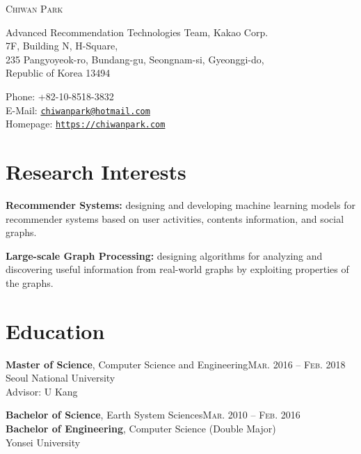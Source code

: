 \documentclass[11pt,a4paper]{article}
\makeatletter
\def\myname{Chiwan Park}
\def\myphone{+82-10-8518-3832}
\def\myaddress{Advanced Recommendation Technologies Team, Kakao Corp.\\
7F, Building N, H-Square,\\
235 Pangyoyeok-ro, Bundang-gu, Seongnam-si, Gyeonggi-do,\\
Republic of Korea 13494}
\def\myemail{chiwanpark@hotmail.com}
\def\myhomepage{https://chiwanpark.com}
\renewenvironment{itemize}{
  \begin{list}{}{
    \setlength{\leftmargin}{1.5em}
    \setlength{\itemsep}{0.5em}
    \setlength{\parskip}{0pt}
    \setlength{\parsep}{0.25em}
  }
}{
  \end{list}
}
\makeatother
\begin{document}
\par{\Huge \textsc{\myname}}

\bigskip

\begin{minipage}[t]{0.625\textwidth}
  \myaddress
\end{minipage}
\begin{minipage}[t]{0.375\textwidth}
  Phone: \myphone\\
  E-Mail: \href{mailto:\myemail}{\texttt{\myemail}}\\
  Homepage: \href{\myhomepage}{\texttt{\myhomepage}}
\end{minipage}

\section*{Research Interests}
\begin{itemize}
  \item \textbf{Recommender Systems:} designing and developing machine learning models for recommender systems based on user activities, contents information, and social graphs.
  \item \textbf{Large-scale Graph Processing:} designing algorithms for analyzing and discovering useful information from real-world graphs by exploiting properties of the graphs.
\end{itemize}

\section*{Education}
\begin{itemize}
  \item \textbf{Master of Science}, Computer Science and Engineering\hfill\textsc{Mar. 2016 -- Feb. 2018}\\
        Seoul National University\\
        Advisor: U Kang
  \item \textbf{Bachelor of Science}, Earth System Sciences\hfill\textsc{Mar. 2010 -- Feb. 2016}\\
        \textbf{Bachelor of Engineering}, Computer Science (Double Major)\\
        Yonsei University
\end{itemize}

\end{document}
